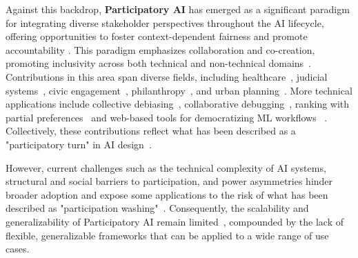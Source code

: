 Against this backdrop, \textbf{Participatory AI} has emerged as a significant paradigm for integrating diverse stakeholder perspectives throughout the AI lifecycle, offering opportunities to foster context-dependent fairness and promote accountability \citep{birhane2022power}. This paradigm emphasizes collaboration and co-creation, promoting inclusivity across both technical and non-technical domains~\citep{hossain2021towards, berditchevskaia2021participatory}. Contributions in this area span diverse fields, including healthcare~\citep{donia2021co}, judicial systems~\citep{barabas2020studying}, civic engagement~\citep{arana2021citizen}, philanthropy~\citep{lee2019webuildai}, and urban planning~\citep{quan2019artificial}. More technical applications include collective debiasing~\citep{chan2024group}, collaborative debugging~\citep{nakao2022toward}, ranking with partial preferences~\citep{cachel2024prefair} and web-based tools for democratizing ML workflows~\citep{zhang2023deliberating} . Collectively, these contributions reflect what has been described as a "participatory turn" in AI design~\citep{delgado2023participatory}.

However, current challenges such as the technical complexity of AI systems, structural and social barriers to participation, and power asymmetries hinder broader adoption and expose some applications to the risk of what has been described as "participation washing"~\citep{sloane2022participation}. Consequently, the scalability and generalizability of Participatory AI remain limited~\citep{delgado2023participatory}, compounded by the lack of flexible, generalizable frameworks that can be applied to a wide range of use cases.